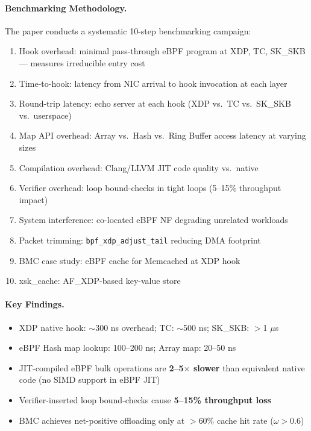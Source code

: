 \paragraph{Benchmarking Methodology.}
The paper conducts a systematic 10-step benchmarking campaign:
\begin{enumerate}
  \item Hook overhead: minimal pass-through eBPF program at XDP, TC, SK\_SKB --- measures irreducible entry cost
  \item Time-to-hook: latency from NIC arrival to hook invocation at each layer
  \item Round-trip latency: echo server at each hook (XDP vs.\ TC vs.\ SK\_SKB vs.\ userspace)
  \item Map API overhead: Array vs.\ Hash vs.\ Ring Buffer access latency at varying sizes
  \item Compilation overhead: Clang/LLVM JIT code quality vs.\ native
  \item Verifier overhead: loop bound-checks in tight loops (5--15\% throughput impact)
  \item System interference: co-located eBPF NF degrading unrelated workloads
  \item Packet trimming: \texttt{bpf\_xdp\_adjust\_tail} reducing DMA footprint
  \item BMC case study: eBPF cache for Memcached at XDP hook
  \item xsk\_cache: AF\_XDP-based key-value store
\end{enumerate}

\paragraph{Key Findings.}
\begin{itemize}
  \item XDP native hook: $\sim$300 ns overhead; TC: $\sim$500 ns; SK\_SKB: $>$1 $\mu$s
  \item eBPF Hash map lookup: 100--200 ns; Array map: 20--50 ns
  \item JIT-compiled eBPF bulk operations are \textbf{2--5$\times$ slower} than equivalent native code (no SIMD support in eBPF JIT)
  \item Verifier-inserted loop bound-checks cause \textbf{5--15\% throughput loss}
  \item BMC achieves net-positive offloading only at $>$60\% cache hit rate ($\omega > 0.6$)
\end{itemize}

